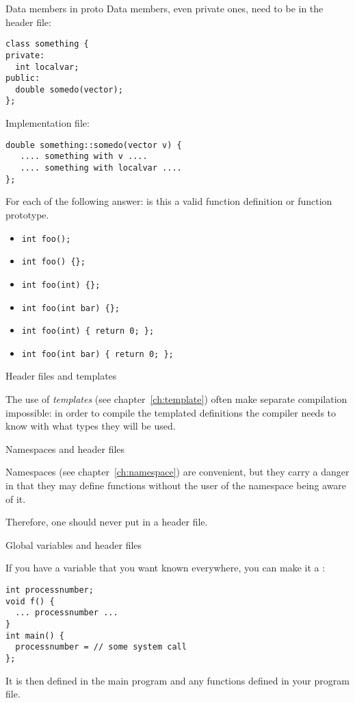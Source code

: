 \begin{block}{Data members in proto}
  Data members, even private ones, need to be in the header file:
\begin{lstlisting}
class something {
private:
  int localvar;
public:
  double somedo(vector);
};
\end{lstlisting}
Implementation file:
\begin{lstlisting}
double something::somedo(vector v) {
   .... something with v ....
   .... something with localvar ....
};
\end{lstlisting}
\end{block}

\begin{review}
  \label{rev:proto-c-cpp}
  For each of the following answer: is this a valid function
  definition or function prototype.
  \begin{itemize}
  \item \verb+int foo();+
  \item \verb+int foo() {};+
  \item \verb+int foo(int) {};+
  \item \verb+int foo(int bar) {};+
  \item \verb+int foo(int) { return 0; };+
  \item \verb+int foo(int bar) { return 0; };+
  \end{itemize}
\end{review}

 {Header files and templates}

The use of \emph{templates}
(see chapter~\ref{ch:template})
often make separate compilation impossible: in order to compile the
templated definitions the compiler needs to know with what types they
will be used.

 {Namespaces and header files}

Namespaces
(see chapter~\ref{ch:namespace})
are convenient, but they carry a danger in that they may define
functions without the user of the namespace being aware of it.

Therefore, one should never put  in a header
file.

 {Global variables and header files}
\label{ex:globalvar}

If you have a variable that you want known everywhere, you can make it
a :
\begin{lstlisting}
int processnumber;
void f() {
  ... processnumber ...
}
int main() {
  processnumber = // some system call
};
\end{lstlisting}
It is then defined in the main program and any functions defined in your program file.


